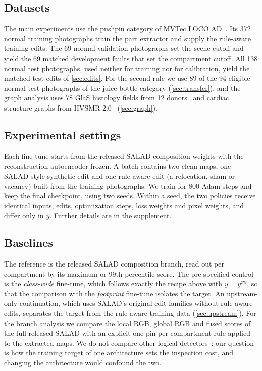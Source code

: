 \documentclass[10pt,twocolumn,letterpaper]{article}
\begin{document}
\subsection{Datasets}
The main experiments use the pushpin category of MVTec LOCO AD~\cite{bergmann2022}. Its 372 normal training photographs train the part extractor and supply the rule-aware training edits. The 69 normal validation photographs set the scene cutoff and yield the 69 matched development faults that set the compartment cutoff. All 138 normal test photographs, used neither for training nor for calibration, yield the matched test edits of \cref{sec:edits}. For the second rule we use 89 of the 94 eligible normal test photographs of the juice-bottle category (\cref{sec:transfer}), and the graph analysis uses 78 GlaS histology fields from 12 donors~\cite{glas2017} and cardiac structure graphs from HVSMR-2.0~\cite{pace2024} (\cref{sec:graph}).

\subsection{Experimental settings}
Each fine-tune starts from the released SALAD composition weights with the reconstruction autoencoder frozen. A batch contains two clean maps, one SALAD-style synthetic edit and one rule-aware edit (a relocation, sham or vacancy) built from the training photographs. We train for 800 Adam steps and keep the final checkpoint, using two seeds. Within a seed, the two policies receive identical inputs, edits, optimization steps, loss weights and pixel weights, and differ only in $y$. Further details are in the supplement.

\subsection{Baselines}
The reference is the released SALAD composition branch, read out per compartment by its maximum or 99th-percentile score. The pre-specified control is the \emph{class-wide} fine-tune, which follows exactly the recipe above with $y=y^{\text{cw}}$, so that the comparison with the \emph{footprint} fine-tune isolates the target. An upstream-only continuation, which uses SALAD's original edit families without rule-aware edits, separates the target from the rule-aware training data (\cref{sec:upstream}). For the branch analysis we compare the local RGB, global RGB and fused scores of the full released SALAD with an explicit one-pin-per-compartment rule applied to the extracted maps. We do not compare other logical detectors~\cite{liu2023,zhang2026logico}: our question is how the training target of one architecture sets the inspection cost, and changing the architecture would confound the two.
\end{document}

